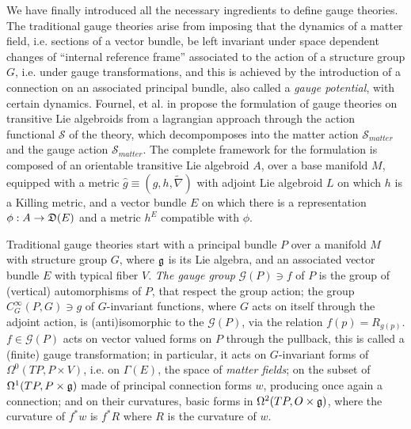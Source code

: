 We have finally introduced all the necessary ingredients to define gauge theories. The traditional gauge theories arise from imposing that the dynamics of a matter field, i.e. sections of a vector bundle, be left invariant under space dependent changes of ``internal reference frame'' associated to the action of a structure group $G$, i.e. under gauge transformations, and this is achieved by the introduction of a connection on an associated principal bundle, also called a \emph{gauge potential}, with certain dynamics. Fournel, et al. in \cite{Fournel2013} propose the formulation of gauge theories on transitive Lie algebroids from a lagrangian approach through the action functional $\mathcal S$ of the theory, which decompomposes into the matter action $\mathcal S_{matter}$ and the gauge action $\mathcal S_{matter}$. The complete framework for the formulation is composed of an orientable transitive Lie algebroid $A$, over a base manifold $M$, equipped with a metric $\hat g \equiv (g, h, \tilde \nabla)$ with adjoint Lie algebroid $L$ on which $h$ is a Killing metric, and a vector bundle $E$ on which there is a representation $\phi: A \to \alg D(E)$ and a metric $h^E$ compatible with $\phi$.

Traditional gauge theories start with a principal bundle $P$  over a manifold $M$ with structure group $G$, where $\mathfrak{g}$ is its Lie algebra, and an associated vector bundle $E$ with typical fiber $V$. \emph{The gauge group} $\mathcal G(P) \ni f$ of $P$ is the group of (vertical) automorphisms of $P$, that respect the group action; the group $C^\infty_G(P, G) \ni g$ of $G$-invariant functions, where $G$ acts on itself through the adjoint action, is (anti)isomorphic to the $\mathcal G(P)$, via the relation $f(p) = R_{g(p)}$. $f\in \mathcal G(P)$ acts on vector valued forms on $P$ through the pullback, this is called a (finite) gauge transformation; in particular, it acts on $G$-invariant forms of $\Omega^0(TP, P \times V)$, i.e. on $\Gamma(E)$, the space of \emph{matter fields}; on the subset of $\Omega^1(TP, P \times \mathfrak{g})$ made of principal connection forms $w$, producing once again a connection; and on their curvatures, basic forms in $\Omega^2(TP, O \times \mathfrak{g})$, where the curvature of $f^*w$ is $f^*R$ where $R$ is the curvature of $w$.

